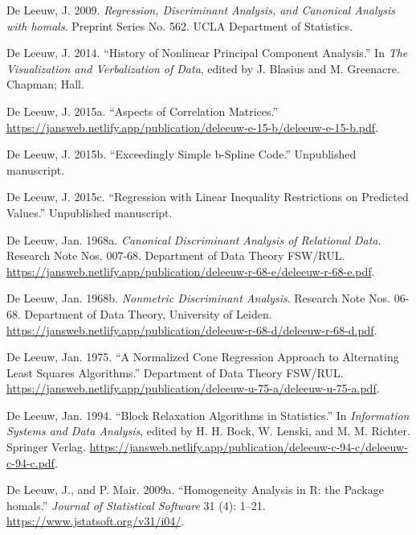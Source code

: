 \documentclass[
  12pt,
  letterpaper,
  DIV=11,
  numbers=noendperiod]{scrreprt}
\newlength{\cslhangindent}
\newenvironment{CSLReferences}[2] %
 {\begin{list}{}{%
  \setlength{\itemindent}{0pt}
  \setlength{\leftmargin}{0pt}
  \setlength{\parsep}{0pt}
  \ifodd #1
   \setlength{\leftmargin}{\cslhangindent}
   \setlength{\itemindent}{-1\cslhangindent}
  \fi
  \setlength{\itemsep}{#2\baselineskip}}}
 {\end{list}}
\begin{document}
\begin{CSLReferences}{1}{1}
De Leeuw, J. 2009. \emph{{Regression, Discriminant Analysis, and
Canonical Analysis with homals}}. Preprint Series No. 562. UCLA
Department of Statistics.

De Leeuw, J. 2014. {``{History of Nonlinear Principal Component
Analysis}.''} In \emph{{The Visualization and Verbalization of Data}},
edited by J. Blasius and M. Greenacre. Chapman; Hall.

De Leeuw, J. 2015a. {``{Aspects of Correlation Matrices}.''}
\url{https://jansweb.netlify.app/publication/deleeuw-e-15-b/deleeuw-e-15-b.pdf}.

De Leeuw, J. 2015b. {``Exceedingly Simple b-Spline Code.''} Unpublished
manuscript.

De Leeuw, J. 2015c. {``Regression with Linear Inequality Restrictions on
Predicted Values.''} Unpublished manuscript.

De Leeuw, Jan. 1968a. \emph{Canonical Discriminant Analysis of
Relational Data}. Research Note Nos. 007-68. Department of Data Theory
FSW/RUL.
\url{https://jansweb.netlify.app/publication/deleeuw-r-68-e/deleeuw-r-68-e.pdf}.

De Leeuw, Jan. 1968b. \emph{Nonmetric Discriminant Analysis}. Research
Note Nos. 06-68. Department of Data Theory, University of Leiden.
\url{https://jansweb.netlify.app/publication/deleeuw-r-68-d/deleeuw-r-68-d.pdf}.

De Leeuw, Jan. 1975. {``{A Normalized Cone Regression Approach to
Alternating Least Squares Algorithms}.''} Department of Data Theory
FSW/RUL.
\url{https://jansweb.netlify.app/publication/deleeuw-u-75-a/deleeuw-u-75-a.pdf}.

De Leeuw, Jan. 1994. {``{Block Relaxation Algorithms in Statistics}.''}
In \emph{Information Systems and Data Analysis}, edited by H. H. Bock,
W. Lenski, and M. M. Richter. Springer Verlag.
\url{https://jansweb.netlify.app/publication/deleeuw-c-94-c/deleeuw-c-94-c.pdf}.

De Leeuw, J., and P. Mair. 2009a. {``{Homogeneity Analysis in {R}: the
Package homals}.''} \emph{Journal of Statistical Software} 31 (4):
1--21. \url{https://www.jstatsoft.org/v31/i04/}.


\end{CSLReferences}
\end{document}
